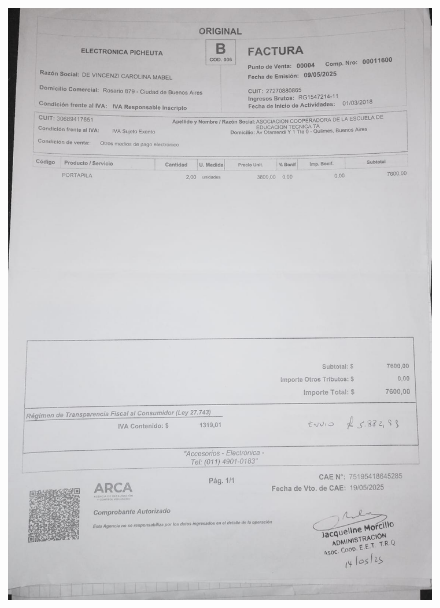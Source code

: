 \documentclass[12pt,a4paper]{article}
\begin{document}
\begin{figure}
    \centering
    \includegraphics[width=1\linewidth]{Carpeta de campo/factura2.png}
\end{figure}
\end{document}
